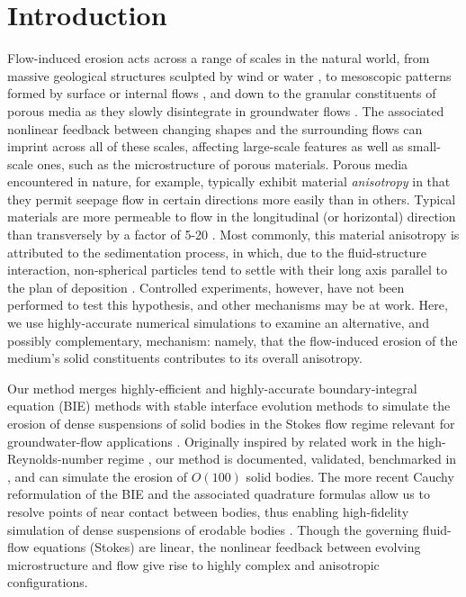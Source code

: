 \documentclass[3p]{elsarticle}
\begin{document}


\section{Introduction}

	Flow-induced erosion acts across a range of scales in the natural world, from massive geological structures sculpted by wind or water \cite{abrams2009growth, perkins2015amplification, mac2020ultra, sharma2022alcove, mac2022morphological}, to mesoscopic patterns formed by surface or internal flows \cite{berhanu2012shape, bertagni2021hydrodynamic}, and down to the granular constituents of porous media as they slowly disintegrate in groundwater flows \cite{zareei2022temporal}. The associated nonlinear feedback between changing shapes and the surrounding flows can imprint across all of these scales, affecting large-scale features as well as small-scale ones, such as the microstructure of porous materials. Porous media encountered in nature, for example, typically exhibit material {\em anisotropy} in that they permit seepage flow in certain directions more easily than in others. Typical materials are more permeable to flow in the longitudinal (or horizontal) direction than transversely by a factor of 5-20 \cite{bear1988dynamics, anderson2015applied}. Most commonly, this material anisotropy is attributed to the sedimentation process, in which, due to the fluid-structure interaction, non-spherical particles tend to settle with their long axis parallel to the plan of deposition \cite{bear1988dynamics}. Controlled experiments, however, have not been performed to test this hypothesis, and other mechanisms may be at work. Here, we use highly-accurate numerical simulations to examine an alternative, and possibly complementary, mechanism: namely, that the flow-induced erosion of the medium's solid constituents contributes to its overall anisotropy.

	Our method merges highly-efficient and highly-accurate boundary-integral equation (BIE) methods with stable interface evolution methods to simulate the erosion of dense suspensions of solid bodies in the Stokes flow regime relevant for groundwater-flow applications \cite{quaife2018boundary}. Originally inspired by related work in the high-Reynolds-number regime \cite{Ristroph2012, Moore2013, Huang2015, MooreCPAM2017}, our method is documented, validated, benchmarked in \cite{quaife2018boundary}, and can simulate the erosion of $O(100)$ solid bodies. The more recent Cauchy reformulation of the BIE and the associated  quadrature formulas allow us to resolve points of near contact between bodies, thus enabling high-fidelity simulation of dense suspensions of erodable bodies \cite{chiu2020viscous}. Though the governing fluid-flow equations (Stokes) are linear, the nonlinear feedback between evolving microstructure and flow give rise to highly complex and anisotropic configurations.
	
\end{document}
